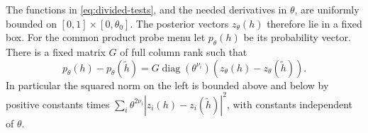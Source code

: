\begin{lemma}\label{lem:observable-scales}
The functions in \eqref{eq:divided-tests}, and the needed derivatives in
$\theta$, are uniformly bounded on $[0,1]\times[0,\theta_0]$.
The posterior vectors $z_\theta(h)$ therefore lie in a fixed box.
For the common product probe menu let $p_\theta(h)$ be its probability
vector. There is a fixed matrix $G$ of full column rank such that
\begin{equation}\label{eq:physical-metric}
 p_\theta(h)-p_\theta(\widetilde h)
    =G\operatorname{diag}(\theta^{\nu_i})
          (z_\theta(h)-z_\theta(\widetilde h)).
\end{equation}
In particular the squared norm on the left is bounded above and below
by positive constants times
$\sum_i\theta^{2\nu_i}|z_i(h)-z_i(\widetilde h)|^2$,
with constants independent of $\theta$.
\end{lemma}
